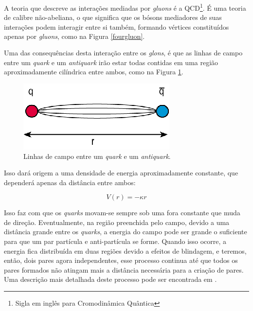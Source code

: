 A teoria que descreve as interações mediadas por \emph{gluons} é a
QCD\footnote{Sigla em inglês para Cromodinâmica Quântica}. É uma teoria
de calibre não-abeliana, o que significa que os bósons mediadores
de suas interações podem interagir entre si também, formando vértices
constituídos apenas por \emph{gluons}, como na Figura \ref{fourgluon}.



Uma das consequências desta interação entre os \emph{glons}, é que as linhas
de campo entre um \emph{quark} e um \emph{antiquark} irão estar todas contidas
em uma região aproximadamente cilíndrica entre ambos, como na Figura \ref{linhascampo}.

\begin{figure}[!h]
\centering
 \includegraphics[scale=0.5]{Content/gluonfield.png}
 \caption{Linhas de campo entre um \emph{quark} e um \emph{antiquark}.}
 \label{linhascampo}
\end{figure}

Isso dará origem a uma densidade de energia aproximadamente constante, que dependerá
apenas da distância entre ambos:

\begin{equation}
 V(r) = -\kappa r
\end{equation}

Isso faz com que os \emph{quarks} movam-se sempre sob uma fora constante que muda de direção.
Eventualmente, na região preenchida pelo campo, devido a uma distância grande entre os \emph{quarks},
a energia do campo pode ser grande o suficiente para que um par partícula e anti-partícula se forme.
Quando isso ocorre, a energia fica distribuída em duas regiões devido a efeitos de blindagem, e teremos,
então, dois pares agora independentes, esse processo continua até que todos os pares formados não atingam
mais a distância necessária para a criação de pares. Uma descrição mais detalhada deste processo pode ser
encontrada em \cite{bierlich_rope_2017,andersson_recent_2002,skands_introduction_2013}.